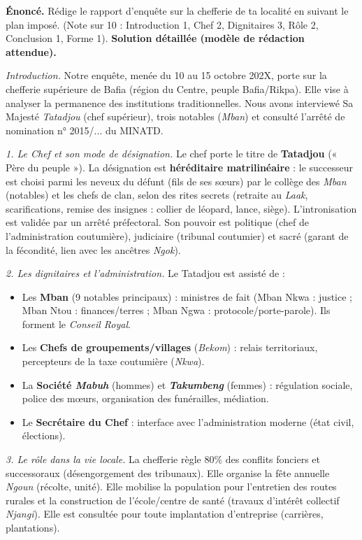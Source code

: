 \documentclass[11pt]{article}
\begin{document}
\begin{exoresolu}
\textbf{Énoncé.} Rédige le rapport d'enquête sur la chefferie de ta localité en suivant le plan imposé. (Note sur 10 : Introduction 1, Chef 2, Dignitaires 3, Rôle 2, Conclusion 1, Forme 1).
\tcblower
\textbf{Solution détaillée (modèle de rédaction attendue).}

\emph{Introduction.} Notre enquête, menée du 10 au 15 octobre 202X, porte sur la chefferie supérieure de Bafia (région du Centre, peuple Bafia/Rikpa). Elle vise à analyser la permanence des institutions traditionnelles. Nous avons interviewé Sa Majesté \emph{Tatadjou} (chef supérieur), trois notables (\emph{Mban}) et consulté l'arrêté de nomination n° 2015/... du MINATD.

\emph{1. Le Chef et son mode de désignation.} Le chef porte le titre de \textbf{Tatadjou} (« Père du peuple »). La désignation est \textbf{héréditaire matrilinéaire} : le successeur est choisi parmi les neveux du défunt (fils de ses sœurs) par le collège des \emph{Mban} (notables) et les chefs de clan, selon des rites secrets (retraite au \emph{Laak}, scarifications, remise des insignes : collier de léopard, lance, siège). L'intronisation est validée par un arrêté préfectoral. Son pouvoir est politique (chef de l'administration coutumière), judiciaire (tribunal coutumier) et sacré (garant de la fécondité, lien avec les ancêtres \emph{Ngok}).

\emph{2. Les dignitaires et l'administration.} Le Tatadjou est assisté de :
\begin{itemize}
\item Les \textbf{Mban} (9 notables principaux) : ministres de fait (Mban Nkwa : justice ; Mban Ntou : finances/terres ; Mban Ngwa : protocole/porte-parole). Ils forment le \emph{Conseil Royal}.
\item Les \textbf{Chefs de groupements/villages} (\emph{Bekom}) : relais territoriaux, percepteurs de la taxe coutumière (\emph{Nkwa}).
\item La \textbf{Société \emph{Mabuh}} (hommes) et \textbf{\emph{Takumbeng}} (femmes) : régulation sociale, police des mœurs, organisation des funérailles, médiation.
\item Le \textbf{Secrétaire du Chef} : interface avec l'administration moderne (état civil, élections).
\end{itemize}

\emph{3. Le rôle dans la vie locale.} La chefferie règle 80\% des conflits fonciers et successoraux (désengorgement des tribunaux). Elle organise la fête annuelle \emph{Ngoun} (récolte, unité). Elle mobilise la population pour l'entretien des routes rurales et la construction de l'école/centre de santé (travaux d'intérêt collectif \emph{Njangi}). Elle est consultée pour toute implantation d'entreprise (carrières, plantations).


\end{exoresolu}
\end{document}
